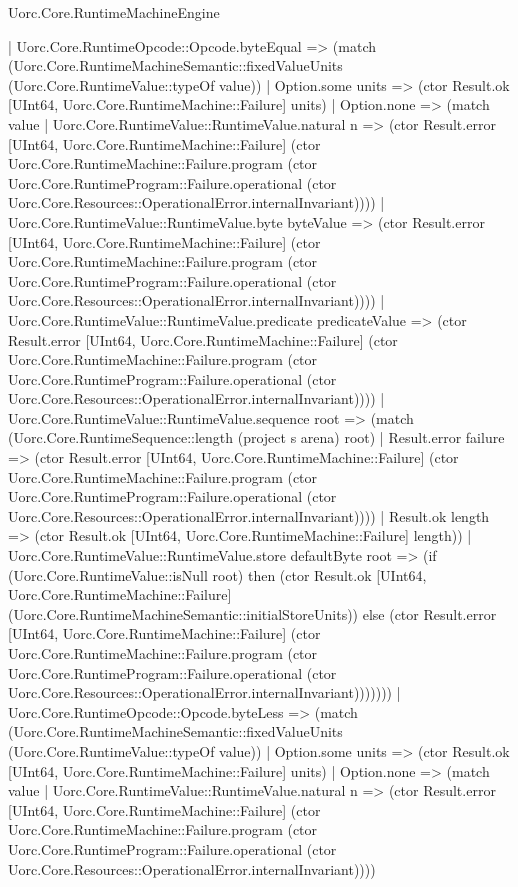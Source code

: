 \begin{lexlean}{Uorc.Core.RuntimeMachineEngine}
\begin{semanticmodule}
{          | Uorc.Core.RuntimeOpcode::Opcode.byteEqual => (match (Uorc.Core.RuntimeMachineSemantic::fixedValueUnits (Uorc.Core.RuntimeValue::typeOf value))
            | Option.some units => (ctor Result.ok [UInt64, Uorc.Core.RuntimeMachine::Failure] units)
            | Option.none => (match value
              | Uorc.Core.RuntimeValue::RuntimeValue.natural n => (ctor Result.error [UInt64, Uorc.Core.RuntimeMachine::Failure] (ctor Uorc.Core.RuntimeMachine::Failure.program (ctor Uorc.Core.RuntimeProgram::Failure.operational (ctor Uorc.Core.Resources::OperationalError.internalInvariant))))
              | Uorc.Core.RuntimeValue::RuntimeValue.byte byteValue => (ctor Result.error [UInt64, Uorc.Core.RuntimeMachine::Failure] (ctor Uorc.Core.RuntimeMachine::Failure.program (ctor Uorc.Core.RuntimeProgram::Failure.operational (ctor Uorc.Core.Resources::OperationalError.internalInvariant))))
              | Uorc.Core.RuntimeValue::RuntimeValue.predicate predicateValue => (ctor Result.error [UInt64, Uorc.Core.RuntimeMachine::Failure] (ctor Uorc.Core.RuntimeMachine::Failure.program (ctor Uorc.Core.RuntimeProgram::Failure.operational (ctor Uorc.Core.Resources::OperationalError.internalInvariant))))
              | Uorc.Core.RuntimeValue::RuntimeValue.sequence root => (match (Uorc.Core.RuntimeSequence::length (project s arena) root)
                | Result.error failure => (ctor Result.error [UInt64, Uorc.Core.RuntimeMachine::Failure] (ctor Uorc.Core.RuntimeMachine::Failure.program (ctor Uorc.Core.RuntimeProgram::Failure.operational (ctor Uorc.Core.Resources::OperationalError.internalInvariant))))
                | Result.ok length => (ctor Result.ok [UInt64, Uorc.Core.RuntimeMachine::Failure] length))
              | Uorc.Core.RuntimeValue::RuntimeValue.store defaultByte root => (if (Uorc.Core.RuntimeValue::isNull root) then (ctor Result.ok [UInt64, Uorc.Core.RuntimeMachine::Failure] (Uorc.Core.RuntimeMachineSemantic::initialStoreUnits)) else (ctor Result.error [UInt64, Uorc.Core.RuntimeMachine::Failure] (ctor Uorc.Core.RuntimeMachine::Failure.program (ctor Uorc.Core.RuntimeProgram::Failure.operational (ctor Uorc.Core.Resources::OperationalError.internalInvariant)))))))
          | Uorc.Core.RuntimeOpcode::Opcode.byteLess => (match (Uorc.Core.RuntimeMachineSemantic::fixedValueUnits (Uorc.Core.RuntimeValue::typeOf value))
            | Option.some units => (ctor Result.ok [UInt64, Uorc.Core.RuntimeMachine::Failure] units)
            | Option.none => (match value
              | Uorc.Core.RuntimeValue::RuntimeValue.natural n => (ctor Result.error [UInt64, Uorc.Core.RuntimeMachine::Failure] (ctor Uorc.Core.RuntimeMachine::Failure.program (ctor Uorc.Core.RuntimeProgram::Failure.operational (ctor Uorc.Core.Resources::OperationalError.internalInvariant))))
}
\end{semanticmodule}
\end{lexlean}
